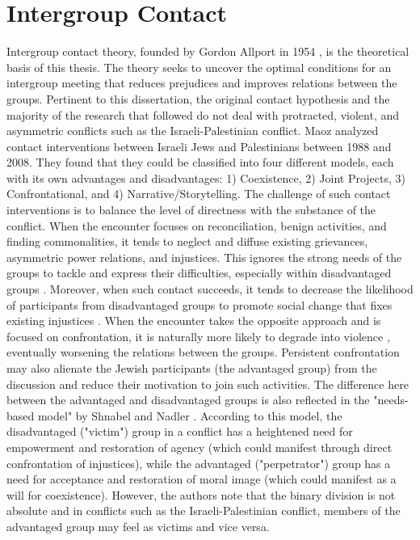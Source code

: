 \documentclass[dissertation,math,vertlayout,pdfa,colorlinks]{aaltoseries}
\begin{document}
\pagebreak

\section{Intergroup Contact}
Intergroup contact theory, founded by Gordon Allport in 1954 \cite{allportNaturePrejudice1954}, is the theoretical basis of this thesis. The theory seeks to uncover the optimal conditions for an intergroup meeting that reduces prejudices and improves relations between the groups. Pertinent to this dissertation, the original contact hypothesis and the majority of the research that followed do not deal with protracted, violent, and asymmetric conflicts such as the Israeli-Palestinian conflict. Maoz \cite{maozDoesContactWork2011} analyzed contact interventions between Israeli Jews and Palestinians between 1988 and 2008. They found that they could be classified into four different models, each with its own advantages and disadvantages: 1) Coexistence, 2) Joint Projects, 3) Confrontational, and 4) Narrative/Storytelling. The challenge of such contact interventions is to balance the level of directness with the substance of the conflict. When the encounter focuses on reconciliation, benign activities, and finding commonalities, it tends to neglect and diffuse existing grievances, asymmetric power relations, and injustices. This ignores the strong needs of the groups to tackle and express their difficulties, especially within disadvantaged groups \cite{maozMultipleConflictsCompeting2000,shnabelNeedsbasedModelReconciliation2008}. Moreover, when such contact succeeds, it tends to decrease the likelihood of participants from disadvantaged groups to promote social change that fixes existing injustices \cite{durrheimIntergroupContactStruggle2018, dixonOptimalContactStrategy2005, albzourTalkingSegregationWall2022, bekermanRethinkingIntergroupEncounters2007}. When the encounter takes the opposite approach and is focused on confrontation, it is naturally more likely to degrade into violence \cite{maozTheyUnderstandOnly2007}, eventually worsening the relations between the groups. Persistent confrontation may also alienate the Jewish participants (the advantaged group) from the discussion and reduce their motivation to join such activities. The difference here between the advantaged and disadvantaged groups is also reflected in the "needs-based model" by Shnabel and Nadler \cite{shnabelNeedsbasedModelReconciliation2008,nadlerIntergroupReconciliationInstrumental2015, shnabelChapterFourNeedsbased2023}. According to this model, the disadvantaged ("victim") group in a conflict has a heightened need for empowerment and restoration of agency (which could manifest through direct confrontation of injustices), while the advantaged ("perpetrator") group has a need for acceptance and restoration of moral image (which could manifest as a will for coexistence). However, the authors note that the binary division is not absolute and in conflicts such as the Israeli-Palestinian conflict, members of the advantaged group may feel as victims and vice versa.
\end{document}
